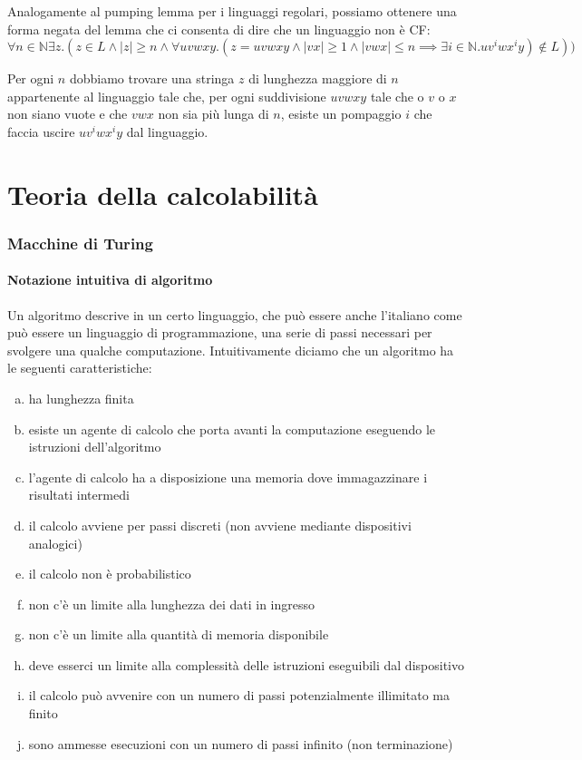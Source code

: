\documentclass[a4paper,titlepage]{article}
\theoremstyle{definition}
\newcommand{\N}{\mathbb{N}}
\begin{document}
Analogamente al pumping lemma per i linguaggi regolari, possiamo ottenere una forma negata del lemma che ci consenta di dire che un linguaggio non è CF:
\[
	\forall n\in\N\exists z.(z\in L\land|z|\geq n\land\forall uvwxy.(z=uvwxy\land|vx|\geq 1\land|vwx|\leq n\implies\exists i\in\N.uv^iwx^iy)\notin L))
\]

Per ogni $n$ dobbiamo trovare una stringa $z$ di lunghezza maggiore di $n$ appartenente al linguaggio tale che, per ogni suddivisione $uvwxy$ tale che o $v$ o $x$ non siano vuote e che $vwx$ non sia più lunga di $n$, esiste un pompaggio $i$ che faccia uscire $uv^iwx^iy$ dal linguaggio. 

\part{Teoria della calcolabilità}
\section{Macchine di Turing}
\subsection{Notazione intuitiva di algoritmo}
Un algoritmo descrive in un certo linguaggio, che può essere anche l'italiano come può essere un linguaggio di programmazione, una serie di passi necessari per svolgere una qualche computazione. Intuitivamente diciamo che un algoritmo ha le seguenti caratteristiche:
\begin{enumerate}[(a)]
	\item ha lunghezza finita
	\item esiste un agente di calcolo che porta avanti la computazione eseguendo le istruzioni dell'algoritmo
	\item l'agente di calcolo ha a disposizione una memoria dove immagazzinare i risultati intermedi
	\item il calcolo avviene per passi discreti (non avviene mediante dispositivi analogici)
	\item il calcolo non è probabilistico 
	\item non c'è un limite alla lunghezza dei dati in ingresso 
	\item non c'è un limite alla quantità di memoria disponibile 
	\item deve esserci un limite alla complessità delle istruzioni eseguibili dal dispositivo 
	\item il calcolo può avvenire con un numero di passi potenzialmente illimitato ma finito
	\item sono ammesse esecuzioni con un numero di passi infinito (non terminazione)
\end{enumerate}
\end{document}
